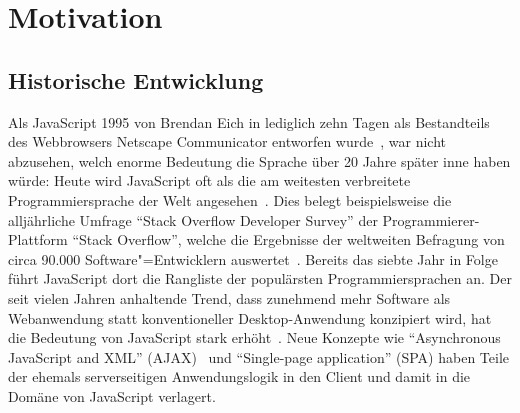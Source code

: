 \chapter{Motivation}
\label{chap:motiviation}

\section{Historische Entwicklung}

Als JavaScript 1995 von Brendan Eich in lediglich zehn Tagen als Bestandteils des Webbrowsers Netscape Communicator entworfen wurde~\autocite{severance:2012:js10days}, war nicht abzusehen, welch enorme Bedeutung die Sprache über 20 Jahre später inne haben würde: Heute wird JavaScript oft als die am weitesten verbreitete Programmiersprache der Welt angesehen~\autocite{PAULSON:2007,CROCKFORD:JS_POPULAR}. Dies belegt beispielsweise die alljährliche Umfrage \enquote{Stack Overflow Developer Survey} der Programmierer-Plattform \enquote{Stack Overflow}, welche die Ergebnisse der weltweiten Befragung von circa 90.000 Software"=Entwicklern auswertet~\autocite{STACKOVERFLOW:SURVEY}. Bereits das siebte Jahr in Folge führt JavaScript dort die Rangliste der populärsten Programmiersprachen an. Der seit vielen Jahren anhaltende Trend, dass zunehmend mehr Software als Webanwendung statt konventioneller Desktop-Anwendung konzipiert wird, hat die Bedeutung von JavaScript stark erhöht~\autocite{TAIVALSAARI:2017,CASTELEYN:2014}. Neue Konzepte wie \enquote{Asynchronous JavaScript and XML} (AJAX)~\autocite{GARRET:AJAX} und \enquote{Single-page application} (SPA) haben Teile der ehemals serverseitigen Anwendungslogik in den Client und damit in die Domäne von JavaScript verlagert.

